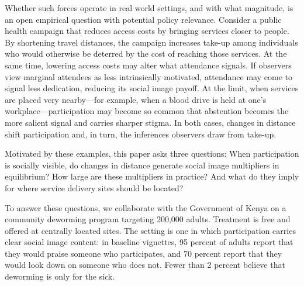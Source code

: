 \documentclass[12pt,a4paper]{article}
\begin{document}
Whether such forces operate in real world settings, and with what magnitude, is an open empirical question with potential policy relevance. Consider a public health campaign that reduces access costs by bringing services closer to people. By shortening travel distances, the campaign increases take-up among individuals who would otherwise be deterred by the cost of reaching those services. At the same time, lowering access costs may alter what attendance signals. If observers view marginal attendees as less intrinsically motivated, attendance may come to signal less dedication, reducing its social image payoff. At the limit, when services are placed very nearby—for example, when a blood drive is held at one’s workplace—participation may become so common that abstention becomes the more salient signal and carries sharper stigma. In both cases, changes in distance shift participation and, in turn, the inferences observers draw from take-up.

Motivated by these examples, this paper asks three questions: When participation is socially visible, do changes in distance generate social image multipliers in equilibrium? How large are these multipliers in practice? And what do they imply for where service delivery sites should be located?

To answer these questions, we collaborate with the Government of Kenya on a community deworming program targeting 200{,}000 adults. Treatment is free and offered at centrally located sites. The setting is one in which participation carries clear social image content: in baseline vignettes, 95 percent of adults report that they would praise someone who participates, and 70 percent report that they would look down on someone who does not. Fewer than 2 percent believe that deworming is only for the sick.
\end{document}
